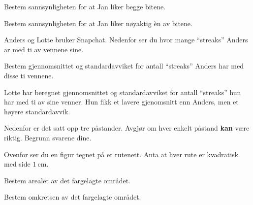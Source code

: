 \begin{oppgaver}
   Bestem sannsynligheten for at Jan liker begge bitene.
\end{oppgaver}

\begin{oppgaver}
   Bestem sannsynligheten for at Jan liker nøyaktig èn av bitene.
\end{oppgaver}


\Oppgave[4]

Anders og Lotte bruker Snapchat. Nedenfor ser du hvor mange \enquote{streaks}
Anders ar med ti av vennene sine.

\begin{oppgaver}
   Bestem gjennomsnittet og standardavviket for antall
    \enquote{streaks} Anders har med disse ti vennene.
\end{oppgaver}

Lotte har beregnet gjennomsnittet og standardavviket for antall
\enquote{streaks} hun har med ti av sine venner. Hun fikk et lavere gjenomsnitt
enn Anders, men et høyere standardavvik.

\begin{oppgaver}
   Nedenfor er det satt opp tre påstander. Avgjør om hver enkelt
    påstand \textbf{kan} være riktig. Begrunn svarene dine.
\end{oppgaver}


\Oppgave[4]

Ovenfor ser du en figur tegnet på et rutenett. Anta at hver rute er kvadratisk
med side $\SI{1}{\cm}$.

\begin{oppgaver}
   Bestem arealet av det fargelagte området.
\end{oppgaver}

\begin{oppgaver}
   Bestem omkretsen av det fargelagte området.
\end{oppgaver}


\Oppgave[6]

